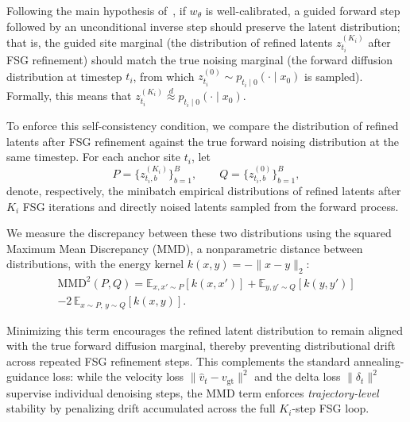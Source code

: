 \documentclass[acmtog]{acmart}
\begin{document}

Following the main hypothesis of~\citet{learn2guide2025}, if \(w_\theta\) is well-calibrated, a guided forward step followed by an unconditional inverse step should preserve the latent distribution; that is, the guided site marginal (the distribution of refined latents \(z_{t_i}^{(K_i)}\) after FSG refinement) should match the true noising marginal (the forward diffusion distribution at timestep \(t_i\), from which \(z_{t_i}^{(0)} \sim p_{t_i\mid0}(\cdot\mid x_0)\) is sampled). Formally, this means that
\(z_{t_i}^{(K_i)} \overset{d}{\approx} p_{t_i\mid0}(\cdot\mid x_0)\).

To enforce this self-consistency condition, we compare the distribution of refined latents after FSG refinement against the true forward noising distribution at the same timestep.
For each anchor site \(t_i\), let
\[
P=\{z_{t_i,b}^{(K_i)}\}_{b=1}^{B}, 
\qquad
Q=\{z_{t_i,b}^{(0)}\}_{b=1}^{B},
\]
denote, respectively, the minibatch empirical distributions of refined latents after \(K_i\) FSG iterations and directly noised latents sampled from the forward process.

We measure the discrepancy between these two distributions using the squared Maximum Mean Discrepancy (MMD), a nonparametric distance between distributions, with the energy kernel \(k(x,y)=-\|x-y\|_2\):
\begin{align*}
\label{eq:mmd}
\mathrm{MMD}^2(P,Q)=
\mathbb{E}_{x,x'\sim P}[k(x,x')]
+
\mathbb{E}_{y,y'\sim Q}[k(y,y')] \\
-
2\,\mathbb{E}_{x\sim P,\,y\sim Q}[k(x,y)].
\end{align*}

Minimizing this term encourages the refined latent distribution to remain aligned with the true forward diffusion marginal, thereby preventing distributional drift across repeated FSG refinement steps.
This complements the standard annealing-guidance loss: while the velocity loss $\|\hat{v}_t - v_{\mathrm{gt}}\|^2$ and the delta loss $\|\delta_{t}\|^2$ supervise individual denoising steps, the MMD term enforces \emph{trajectory-level} stability by penalizing drift accumulated across the full $K_i$-step FSG loop.
\end{document}
